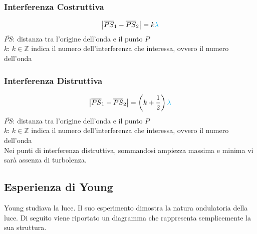 \subsubsection{Interferenza Costruttiva}
\begin{equation*}
  \left\lvert \overline{PS}_1-\overline{PS}_2 \right\rvert = k\mathcolor{cyan}{\lambda}
\end{equation*}
$\overline{PS}$: distanza tra l'origine dell'onda e il punto $P$\\
$k$: $k\in\mathbb{Z}$ indica il numero dell'interferenza che interessa, ovvero il numero dell'onda

\subsubsection{Interferenza Distruttiva}
\begin{equation*}
  \left\lvert \overline{PS}_1-\overline{PS}_2 \right\rvert = 
  \left( k+\frac{1}{2} \right)\mathcolor{cyan}{\lambda}
\end{equation*}
$\overline{PS}$: distanza tra l'origine dell'onda e il punto $P$\\
$k$: $k\in\mathbb{Z}$ indica il numero dell'interferenza che interessa, ovvero il numero dell'onda\\
[\baselineskip]

Nei punti di interferenza distruttiva, sommandosi ampiezza massima e minima vi sarà assenza di 
turbolenza.

\subsection{Esperienza di Young}\label{subsec:onde:young}
Young studiava la luce. Il suo esperimento dimostra la natura ondulatoria della luce. Di seguito
viene riportato un diagramma che rappresenta semplicemente la sua struttura.

